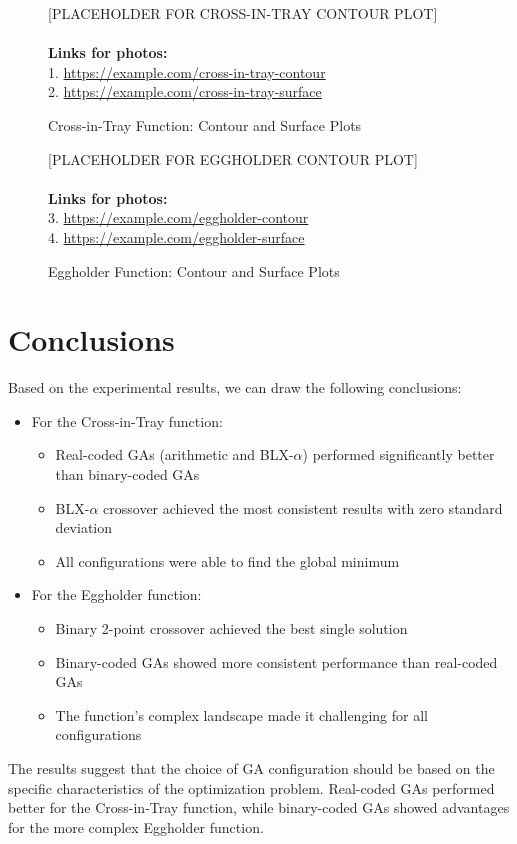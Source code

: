 \documentclass[12pt,a4paper]{article}
\begin{document}
\begin{figure}[H]
    \centering
    [PLACEHOLDER FOR CROSS-IN-TRAY CONTOUR PLOT]\\
    [PLACEHOLDER FOR CROSS-IN-TRAY SURFACE PLOT]
    \\[1em]
    \textbf{Links for photos:}
    \\1. \url{https://example.com/cross-in-tray-contour}
    \\2. \url{https://example.com/cross-in-tray-surface}
    \caption{Cross-in-Tray Function: Contour and Surface Plots}
    \label{fig:cross_in_tray}
\end{figure}

\begin{figure}[H]
    \centering
    [PLACEHOLDER FOR EGGHOLDER CONTOUR PLOT]\\
    [PLACEHOLDER FOR EGGHOLDER SURFACE PLOT]
    \\[1em]
    \textbf{Links for photos:}
    \\3. \url{https://example.com/eggholder-contour}
    \\4. \url{https://example.com/eggholder-surface}
    \caption{Eggholder Function: Contour and Surface Plots}
    \label{fig:eggholder}
\end{figure}

\section{Conclusions}
Based on the experimental results, we can draw the following conclusions:

\begin{itemize}
    \item For the Cross-in-Tray function:
    \begin{itemize}
        \item Real-coded GAs (arithmetic and BLX-$\alpha$) performed significantly better than binary-coded GAs
        \item BLX-$\alpha$ crossover achieved the most consistent results with zero standard deviation
        \item All configurations were able to find the global minimum
    \end{itemize}
    
    \item For the Eggholder function:
    \begin{itemize}
        \item Binary 2-point crossover achieved the best single solution
        \item Binary-coded GAs showed more consistent performance than real-coded GAs
        \item The function's complex landscape made it challenging for all configurations
    \end{itemize}
\end{itemize}

The results suggest that the choice of GA configuration should be based on the specific characteristics of the optimization problem. Real-coded GAs performed better for the Cross-in-Tray function, while binary-coded GAs showed advantages for the more complex Eggholder function.
\end{document}
